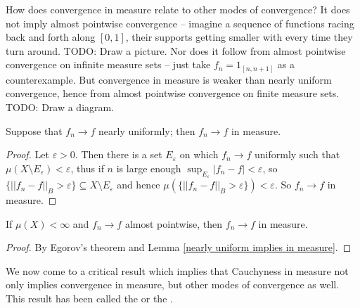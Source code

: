 \begin{subsec}
How does convergence in measure relate to other modes of convergence?
It does not imply almost pointwise convergence -- imagine a sequence of functions racing back and forth along $[0, 1]$, their supports getting smaller with every time they turn around. TODO: Draw a picture.
Nor does it follow from almost pointwise convergence on infinite measure sets -- just take $f_n = 1_{[n, n+1]}$ as a counterexample.
But convergence in measure is weaker than nearly uniform convergence, hence from almost pointwise convergence on finite measure sets. TODO: Draw a diagram.
\end{subsec}

\begin{lemma}
\label{nearly uniform implies in measure}
Suppose that $f_n \to f$ nearly uniformly; then $f_n \to f$ in measure.
\end{lemma}
\begin{proof}
Let $\varepsilon > 0$.
Then there is a set $E_\varepsilon$ on which $f_n \to f$ uniformly such that $\mu(X \setminus E_\varepsilon) < \varepsilon$, thus if $n$ is large enough $\sup_{E_\varepsilon} |f_n - f| < \varepsilon$, so $\{||f_n - f||_B > \varepsilon\} \subseteq X \setminus E_\varepsilon$ and hence $\mu(\{||f_n - f||_B > \varepsilon\}) < \varepsilon$.
So $f_n \to f$ in measure.
\end{proof}

\begin{corollary}
If $\mu(X) < \infty$ and $f_n \to f$ almost pointwise, then $f_n \to f$ in measure.
\end{corollary}
\begin{proof}
By Egorov's theorem and Lemma \ref{nearly uniform implies in measure}.
\end{proof}

\begin{subsec}
We now come to a critical result which implies that Cauchyness in measure not only implies convergence in measure, but other modes of convergence as well.
This result has been called the  or the .
\end{subsec}

